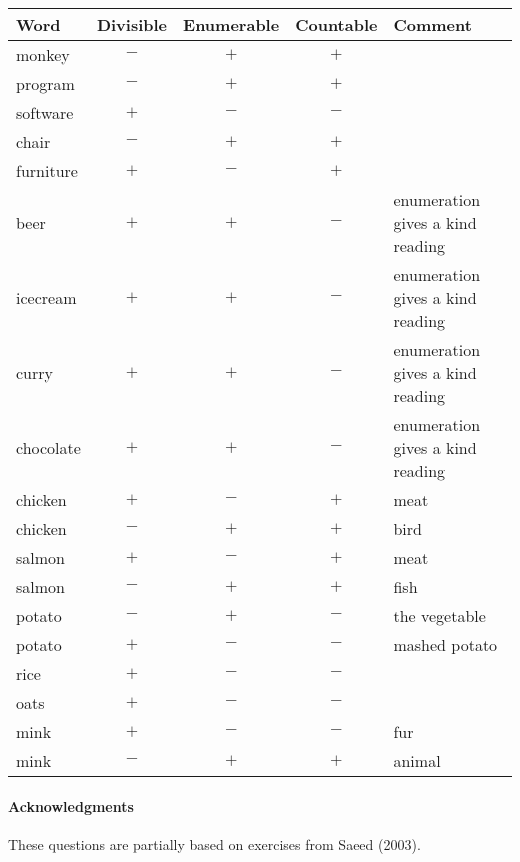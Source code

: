 \documentclass[a4paper]{article}
\begin{document}
\begin{enumerate}
  \begin{tabular}{lcccl}
    Word & Divisible  & Enumerable  & Countable & Comment \\ \hline
    monkey	&  $-$  &  $+$   &  $+$ \\
    program	&  $-$  &  $+$   &  $+$ \\
    software	&  $+$  &  $-$   &  $-$ \\
    chair	&  $-$  &  $+$   &  $+$ \\
    furniture	&  $+$  &  $-$   &  $+$ \\
    beer	&  $+$  &  $+$   &  $-$ & enumeration gives a kind reading \\
    icecream	&  $+$  &  $+$   &  $-$ & enumeration gives a kind reading  \\
    curry	&  $+$  &  $+$   &  $-$ & enumeration gives a kind reading  \\
    chocolate	&  $+$  &  $+$   &  $-$ & enumeration gives a kind reading  \\
    chicken	&  $+$  &  $-$   &  $+$ & meat \\
    chicken	&  $-$  &  $+$   &  $+$ & bird \\
    salmon	&  $+$  &  $-$   &  $+$ & meat \\
    salmon	&  $-$  &  $+$   &  $+$ & fish  \\
    potato	&  $-$  &  $+$   &  $-$ & the vegetable\\
    potato	&  $+$  &  $-$   &  $-$ & mashed potato\\
    rice	&  $+$  &  $-$   &  $-$ \\
    oats	&  $+$  &  $-$   &  $-$ \\
    mink	&  $+$  &  $-$   &  $-$ & fur \\
    mink	&  $-$  &  $+$   &  $+$ & animal\\
  \end{tabular}
  
\end{enumerate}
\vfill
\paragraph{Acknowledgments} These questions are partially
based on exercises from Saeed (2003).
\end{document}
